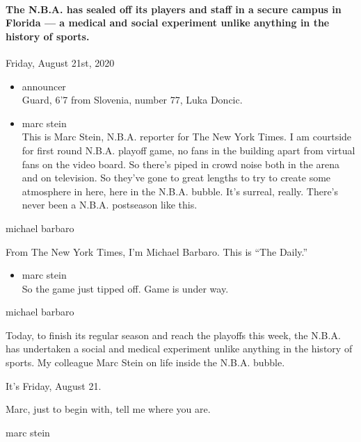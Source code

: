\hypertarget{the-nba-has-sealed-off-its-players-and-staff-in-a-secure-campus-in-florida--a-medical-and-social-experiment-unlike-anything-in-the-history-of-sports-2}{%
\paragraph{The N.B.A. has sealed off its players and staff in a secure
campus in Florida --- a medical and social experiment unlike anything in
the history of
sports.}\label{the-nba-has-sealed-off-its-players-and-staff-in-a-secure-campus-in-florida--a-medical-and-social-experiment-unlike-anything-in-the-history-of-sports-2}}

Friday, August 21st, 2020

\begin{itemize}
\item
  announcer\\
  Guard, 6'7 from Slovenia, number 77, Luka Doncic.
\item
  marc stein\\
  This is Marc Stein, N.B.A. reporter for The New York Times. I am
  courtside for first round N.B.A. playoff game, no fans in the building
  apart from virtual fans on the video board. So there's piped in crowd
  noise both in the arena and on television. So they've gone to great
  lengths to try to create some atmosphere in here, here in the N.B.A.
  bubble. It's surreal, really. There's never been a N.B.A. postseason
  like this.
\end{itemize}

michael barbaro

From The New York Times, I'm Michael Barbaro. This is ``The Daily.''

\begin{itemize}
\tightlist
\item
  marc stein\\
  So the game just tipped off. Game is under way.
\end{itemize}

michael barbaro

Today, to finish its regular season and reach the playoffs this week,
the N.B.A. has undertaken a social and medical experiment unlike
anything in the history of sports. My colleague Marc Stein on life
inside the N.B.A. bubble.

It's Friday, August 21.

Marc, just to begin with, tell me where you are.

marc stein

